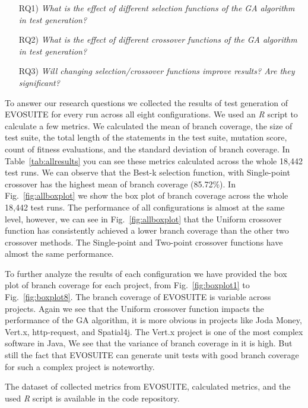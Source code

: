 \documentclass[sigconf]{acmart}
\begin{document}
\begin{itemize}
  \item[RQ1)] \textit{What is the effect of different selection functions of the GA algorithm in test generation?}
  \item[RQ2)] \textit{What is the effect of different crossover functions of the GA algorithm in test generation?}
  \item[RQ3)] \textit{Will changing selection/crossover functions improve results? Are they significant?}
\end{itemize}

To answer our research questions we collected the results of test generation of EVOSUITE for every run across all 
eight configurations.
We used an \textit{R} script to calculate a few metrics. We calculated the mean of branch coverage, the size of test suite, 
the total length of the statements in the test suite, mutation score, count of fitness evaluations, 
and the standard deviation of branch coverage. In Table~\ref{tab:allresults} you can see these metrics calculated 
across the whole 18,442 test runs. We can observe that the Best-k selection function, with  
Single-point crossover has the highest mean of branch coverage (85.72\%). 
In Fig.~\ref{fig:allboxplot} we show the box plot of branch coverage across the whole 18,442 test runs. 
The performance of all configurations is almost at the same level, however, we can see in 
Fig.~\ref{fig:allboxplot} that the Uniform crossover function has consistently achieved a 
lower branch coverage than the other two crossover methods. The Single-point and Two-point crossover 
functions have almost the same performance.

To further analyze the results of each configuration we have provided the box plot of branch coverage 
for each project, from Fig.~\ref{fig:boxplot1} to Fig.~\ref{fig:boxplot8}. The branch coverage 
of EVOSUITE is variable across projects. Again we see that the Uniform crossover function 
impacts the performance of the GA algorithm, it is more obvious in projects like Joda Money,
Vert.x, http-request, and Spatial4j. The Vert.x project is one of the most complex software in Java, 
We see that the variance of branch coverage in it is high. But still the fact 
that EVOSUITE can generate unit tests with good branch coverage for such a complex project is noteworthy. 

The dataset of collected metrics from EVOSUITE, calculated metrics, and 
the used \textit{R} script is available in the code repository. 
\end{document}
